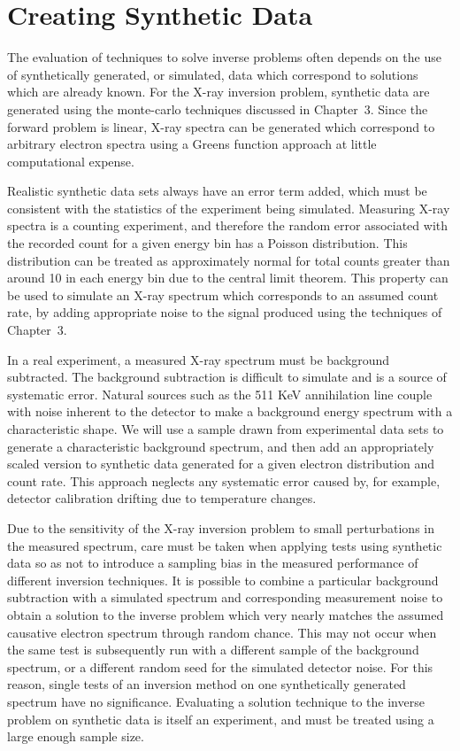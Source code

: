 \section{Creating Synthetic Data}

The evaluation of techniques to solve inverse problems often depends on the use of synthetically generated, or simulated, data which correspond to solutions which are already known. For the X-ray inversion problem, synthetic data are generated using the monte-carlo techniques discussed in Chapter~3. Since the forward problem is linear, X-ray spectra can be generated which correspond to arbitrary electron spectra using a Greens function approach at little computational expense. 

Realistic synthetic data sets always have an error term added, which must be consistent with the statistics of the experiment being simulated. Measuring X-ray spectra is a counting experiment, and therefore the random error associated with the recorded count for a given energy bin has a Poisson distribution. This distribution can be treated as approximately normal for total counts greater than around 10 in each energy bin due to the central limit theorem. This property can be used to simulate an X-ray spectrum which corresponds to an assumed count rate, by adding appropriate noise to the signal produced using the techniques of Chapter~3.

In a real experiment, a measured X-ray spectrum must be background subtracted. The background subtraction is difficult to simulate and is a source of systematic error. Natural sources such as the 511 KeV annihilation line couple with noise inherent to the detector to make a background energy spectrum with a characteristic shape. We will use a sample drawn from experimental data sets to generate a characteristic background spectrum, and then add an appropriately scaled version to synthetic data generated for a given electron distribution and count rate. This approach neglects any systematic error caused by, for example, detector calibration drifting due to temperature changes. 

Due to the sensitivity of the X-ray inversion problem to small perturbations in the measured spectrum, care must be taken when applying tests using synthetic data so as not to introduce a sampling bias in the measured performance of different inversion techniques. It is possible to combine a particular background subtraction with a simulated spectrum and corresponding measurement noise to obtain a solution to the inverse problem which very nearly matches the assumed causative electron spectrum through random chance. This may not occur when the same test is subsequently run with a different sample of the background spectrum, or a different random seed for the simulated detector noise. For this reason, single tests of an inversion method on one synthetically generated spectrum have no significance. Evaluating a solution technique to the inverse problem on synthetic data is itself an experiment, and must be treated using a large enough sample size.  

